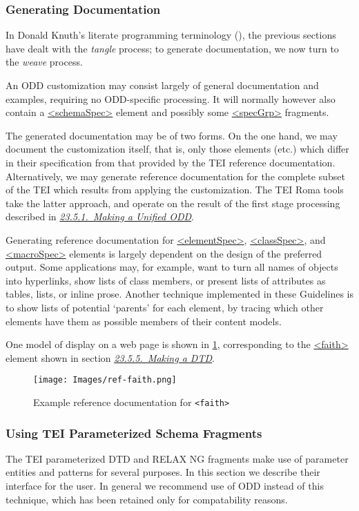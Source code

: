 \subsubsection[{Generating Documentation}]{Generating Documentation}\label{IMGD}\par
In Donald Knuth's literate programming terminology (\cite{KNUTH}), the previous sections have dealt with the \textit{tangle} process; to generate documentation, we now turn to the \textit{weave} process.\par
An ODD customization may consist largely of general documentation and examples, requiring no ODD-specific processing. It will normally however also contain a \hyperref[TEI.schemaSpec]{<schemaSpec>} element and possibly some \hyperref[TEI.specGrp]{<specGrp>} fragments.\par
The generated documentation may be of two forms. On the one hand, we may document the customization itself, that is, only those elements (etc.) which differ in their specification from that provided by the TEI reference documentation. Alternatively, we may generate reference documentation for the complete subset of the TEI which results from applying the customization. The TEI Roma tools take the latter approach, and operate on the result of the first stage processing described in \textit{\hyperref[IM-unified]{23.5.1.\ Making a Unified ODD}}.\par
Generating reference documentation for \hyperref[TEI.elementSpec]{<elementSpec>}, \hyperref[TEI.classSpec]{<classSpec>}, and \hyperref[TEI.macroSpec]{<macroSpec>} elements is largely dependent on the design of the preferred output. Some applications may, for example, want to turn all names of objects into hyperlinks, show lists of class members, or present lists of attributes as tables, lists, or inline prose. Another technique implemented in these Guidelines is to show lists of potential ‘parents’ for each element, by tracing which other elements have them as possible members of their content models.\par
One model of display on a web page is shown in \ref{ref-faith}, corresponding to the \hyperref[TEI.faith]{<faith>} element shown in section \textit{\hyperref[IM-makeDTD]{23.5.5.\ Making a DTD}}.\begin{figure}[htbp]
\noindent\noindent\texttt{[image: Images/ref-faith.png]}
\caption{\label{ref-faith}Example reference documentation for \texttt{<faith>}}\end{figure}

\subsubsection[{Using TEI Parameterized Schema Fragments}]{Using TEI Parameterized Schema Fragments}\label{STPE}\par
The TEI parameterized DTD and RELAX NG fragments make use of parameter entities and patterns for several purposes. In this section we describe their interface for the user. In general we recommend use of ODD instead of this technique, which has been retained only for compatability reasons.
